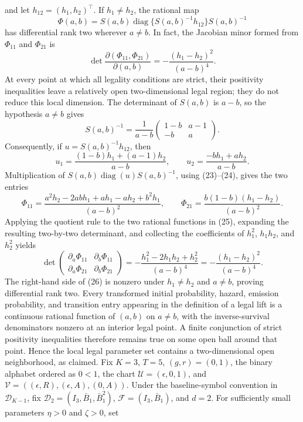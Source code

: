 and let \(h_{12}=(h_1,h_2)^{\top}\). If \(h_1\ne h_2\), the rational map
\[
 \Phi(a,b)=S(a,b)\operatorname{diag}\{S(a,b)^{-1}h_{12}\}S(a,b)^{-1}
\]
has differential rank two wherever \(a\ne b\). In fact, the Jacobian minor formed from \(\Phi_{11}\) and \(\Phi_{21}\) is
\[
 \det\frac{\partial(\Phi_{11},\Phi_{21})}{\partial(a,b)}
 =-\frac{(h_1-h_2)^2}{(a-b)^4}.
\]
At every point at which all legality conditions are strict, their positivity inequalities leave a relatively open two-dimensional legal region; they do not reduce this local dimension.
The determinant of \(S(a,b)\) is \(a-b\), so the hypothesis \(a\ne b\) gives
\[
 S(a,b)^{-1}=\frac{1}{a-b}
 \begin{pmatrix}1-b&a-1\\-b&a\end{pmatrix}.                  \tag{23}
\]
Consequently, if \(u=S(a,b)^{-1}h_{12}\), then
\[
 u_1=\frac{(1-b)h_1+(a-1)h_2}{a-b},\qquad
 u_2=\frac{-bh_1+ah_2}{a-b}.                                  \tag{24}
\]
Multiplication of \(S(a,b)\operatorname{diag}(u)S(a,b)^{-1}\), using (23)--(24), gives the two entries
\[
 \Phi_{11}
 =\frac{a^2h_2-2abh_1+ah_1-ah_2+b^2h_1}{(a-b)^2},\qquad
 \Phi_{21}=\frac{b(1-b)(h_1-h_2)}{(a-b)^2}.                   \tag{25}
\]
Applying the quotient rule to the two rational functions in (25), expanding the resulting two-by-two determinant, and collecting the coefficients of \(h_1^2\), \(h_1h_2\), and \(h_2^2\) yields
\[
 \det\begin{pmatrix}
 \partial_a\Phi_{11}&\partial_b\Phi_{11}\\
 \partial_a\Phi_{21}&\partial_b\Phi_{21}
 \end{pmatrix}
 =-\frac{h_1^2-2h_1h_2+h_2^2}{(a-b)^4}
 =-\frac{(h_1-h_2)^2}{(a-b)^4}.                               \tag{26}
\]
The right-hand side of (26) is nonzero under \(h_1\ne h_2\) and \(a\ne b\), proving differential rank two. Every transformed initial probability, hazard, emission probability, and transition entry appearing in the definition of a legal lift is a continuous rational function of \((a,b)\) on \(a\ne b\), with the inverse-survival denominators nonzero at an interior legal point. A finite conjunction of strict positivity inequalities therefore remains true on some open ball around that point. Hence the local legal parameter set contains a two-dimensional open neighborhood, as claimed.
Fix \(K=3\), \(T=5\), \((g,r)=(0,1)\), the binary alphabet ordered as \(0<1\), the chart \(\mathcal U=(\epsilon,0,1)\), and \(\mathcal V=((\epsilon,R),(\epsilon,A),(0,A))\). Under the baseline-symbol convention in \(\mathcal D_{K-1}\), fix \(\mathcal D_2=(I_3,\bar B_1,\bar B_1^2)\), \(\mathcal F=(I_3,\bar B_1)\), and \(d=2\). For sufficiently small parameters \(\eta>0\) and \(\zeta>0\), set
